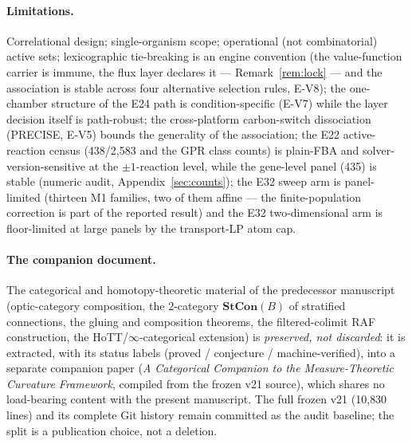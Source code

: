 \documentclass[11pt,a4paper]{article}
\theoremstyle{plain}
\theoremstyle{definition}
\theoremstyle{remark}
\begin{document}
\paragraph{Limitations.}
Correlational design; single-organism scope; operational (not
combinatorial) active sets; lexicographic tie-breaking is an engine
convention (the value-function carrier is immune, the flux layer
declares it --- Remark~\ref{rem:lock} --- and the association is
stable across four alternative selection rules, E-V8); the
one-chamber structure of the E24 path is condition-specific (E-V7)
while the layer decision itself is path-robust; the cross-platform
carbon-switch dissociation (PRECISE, E-V5) bounds the generality of
the association; the E22 active-reaction census (438/2{,}583 and the
GPR class counts) is plain-FBA and solver-version-sensitive at the
$\pm 1$-reaction level, while the gene-level panel (435) is stable
(numeric audit, Appendix~\ref{sec:counts}); the E32 sweep arm is
panel-limited (thirteen M1 families, two of them affine --- the
finite-population correction is part of the reported result) and the
E32 two-dimensional arm is floor-limited at large panels by the
transport-LP atom cap.

\paragraph{The companion document.}
The categorical and homotopy-theoretic material of the predecessor
manuscript (optic-category composition, the $2$-category
$\mathbf{StCon}(B)$ of stratified connections, the gluing and
composition theorems, the filtered-colimit RAF construction, the
HoTT/$\infty$-categorical extension) is \emph{preserved, not
discarded}: it is extracted, with its status labels (proved /
conjecture / machine-verified), into a separate companion paper
(\emph{A Categorical Companion to the Measure-Theoretic Curvature
Framework}, compiled from the frozen v21 source), which shares no
load-bearing content with the present manuscript. The full frozen
v21 (10{,}830 lines) and its complete Git history remain committed
as the audit baseline; the split is a publication choice, not a
deletion.
\end{document}
